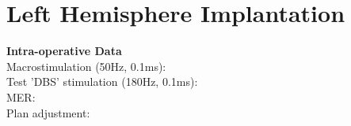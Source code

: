 \documentclass[12pt,fullpage]{article}
\begin{document}

\pagebreak

\section{Left Hemisphere Implantation} 

\textbf{Intra-operative Data}\\
	
\noindent Macrostimulation (50Hz, 0.1ms): \\
Test 'DBS' stimulation (180Hz, 0.1ms): \\
MER: \\
Plan adjustment: \\


\end{document}
